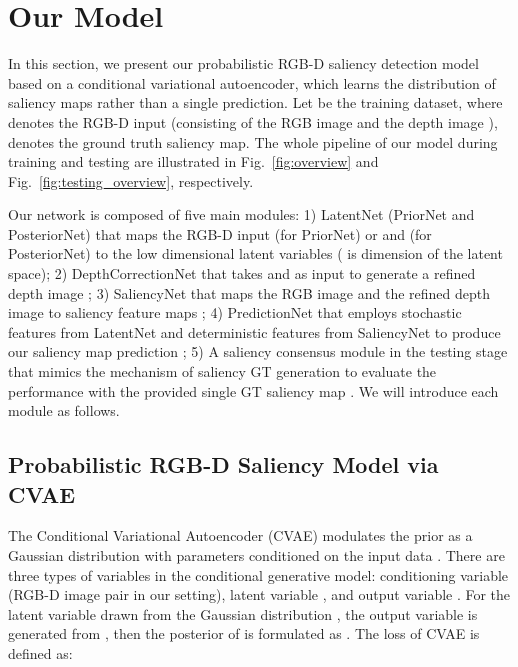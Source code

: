 \documentclass[10pt,twocolumn,letterpaper]{article}
\begin{document}
\section{Our Model}\label{sec:OurApproach}
In this section, we present our probabilistic RGB-D saliency detection model based on a conditional variational autoencoder, which learns the distribution of saliency maps rather than a single prediction.
Let  be the training dataset, where  denotes the RGB-D input (consisting of the RGB image  and the depth image ),  denotes the ground truth saliency map. 
The whole pipeline of our model during training and testing are illustrated in Fig.~\ref{fig:overview} and Fig.~\ref{fig:testing_overview}, respectively. 

Our network is composed of five main modules: 1) LatentNet (PriorNet and PosteriorNet) that maps the RGB-D input  (for PriorNet) or  and  (for PosteriorNet) to the low dimensional latent variables  ( is dimension of the latent space); 2) DepthCorrectionNet that takes  and  as input to generate a refined depth image ; 3) SaliencyNet that maps the RGB image  and the refined depth image  to saliency feature maps ; 4) PredictionNet that employs stochastic features  from LatentNet and deterministic features  from SaliencyNet to produce our saliency map prediction ; 5) A saliency consensus module in the testing stage that mimics the mechanism of saliency GT generation to evaluate the performance with the provided single GT saliency map . We will introduce each module as follows.















\subsection{Probabilistic RGB-D Saliency Model via CVAE}








The Conditional Variational Autoencoder (CVAE) modulates the prior as a Gaussian distribution with parameters conditioned on the input data . There are three types of variables in the conditional generative model:
conditioning variable  (RGB-D image pair in our setting), latent variable , and output variable . 
For the latent variable  drawn from the Gaussian distribution , the output variable  is generated from ,
then the posterior of  is formulated as . The loss of CVAE is defined as:
\end{document}
